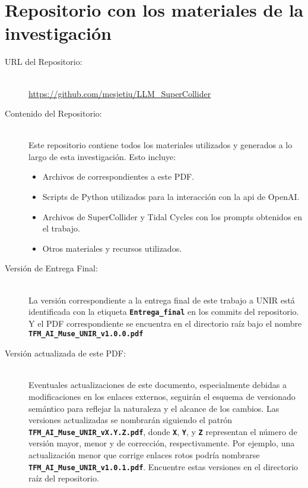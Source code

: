 \chapter{Repositorio con los materiales de la investigación}
\label{anexo:repositorio}



\begin{description}
    \item[URL del Repositorio:] \hfill \\
    \url{https://github.com/mesjetiu/LLM_SuperCollider} 
    
    \item[Contenido del Repositorio:] \hfill \\
    Este repositorio contiene todos los materiales utilizados y generados a lo largo de esta investigación. Esto incluye:
    \begin{itemize}
        \item Archivos de  correspondientes a este PDF.
        \item Scripts de Python utilizados para la interacción con la \gls{api} de OpenAI.
        \item Archivos de SuperCollider y Tidal Cycles con los {prompts} obtenidos en el trabajo.
        \item Otros materiales y recursos utilizados.
    \end{itemize}
    
    \item[Versión de Entrega Final:] \hfill \\
    La versión correspondiente a la entrega final de este trabajo a UNIR está identificada con la etiqueta \textbf{\texttt{Entrega\_final}} en los commits del repositorio. Y el PDF correspondiente se encuentra en el directorio raíz bajo el nombre \textbf{\texttt{TFM\_AI\_Muse\_UNIR\_v1.0.0.pdf}}

	\item[Versión actualizada de este PDF:] \hfill \\
    Eventuales actualizaciones de este documento, especialmente debidas a modificaciones en los enlaces externos, seguirán el esquema de versionado semántico para reflejar la naturaleza y el alcance de los cambios. Las versiones actualizadas se nombrarán siguiendo el patrón \textbf{\texttt{TFM\_AI\_Muse\_UNIR\_vX.Y.Z.pdf}}, donde \textbf{\texttt{X}}, \textbf{\texttt{Y}}, y \textbf{\texttt{Z}} representan el número de versión mayor, menor y de corrección, respectivamente. Por ejemplo, una actualización menor que corrige enlaces rotos podría nombrarse \textbf{\texttt{TFM\_AI\_Muse\_UNIR\_v1.0.1.pdf}}. Encuentre estas versiones en el directorio raíz del repositorio.


\end{description}



